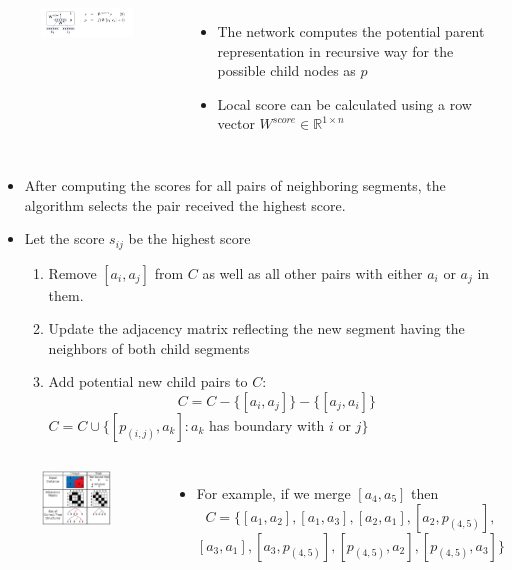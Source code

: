 \documentclass{beamer}
\begin{document}
\frame
{
	\begin{columns}
	\begin{figure}[ht]  
		\begin{center}
			\includegraphics[width=2.2in]{images/fig4.png}   
		\end{center}   
	\end{figure}
	\begin{itemize}
		\item The network computes the potential 
		parent representation in recursive way for the possible child nodes as $ \textit{p} $
		\item Local score can be calculated using a row vector 
		$ W^{score} \in \mathbb{R}^{1\times n} $
	\end{itemize}
	\end{columns}
}
\frame
{
	\begin{itemize}
		\item After computing the scores for all pairs of neighboring segments, 
		the algorithm selects the pair received the highest score. 
		\item Let the score $s_{ij}$ be the highest score
		\begin{enumerate}
			\item Remove $[a_i, a_j] $ from $C$ as well as all other pairs with 
			either $a_i$ or $a_j$ in them. 
			\item Update the adjacency matrix reflecting the new segment having the neighbors of both child segments
			\item Add potential new child pairs to $C$:
			$$ C = C - \{[a_i,a_j]\} - \{[a_j, a_i]\} $$
			$ C = C \cup \{[p_{(i,j)}, a_k]: a_k $ has boundary with $i$ or $j\}$
		\end{enumerate}
	\end{itemize}
}
\frame
{
	\begin{columns}
	\column{0.45\textwidth}
	\begin{figure}[ht]  
		\begin{center}
			\includegraphics[width=2.in]{images/fig3.png}   
		\end{center}   
	\end{figure}
	\column{0.73\textwidth} 
	\begin{itemize}
		\item For example, if we merge $[a_4, a_5]$ then 
		$$ C = \{[a_1, a_2], [a_1, a_3], [a_2, a_1], [a_2, p_{(4,5)}], $$
		$$ [a_3, a_1], [a_3, p_{(4,5)}], [p_{(4,5)}, a_2], [p_{(4,5)}, a_3]\} $$
	\end{itemize}
	\end{columns}
}
\end{document}
